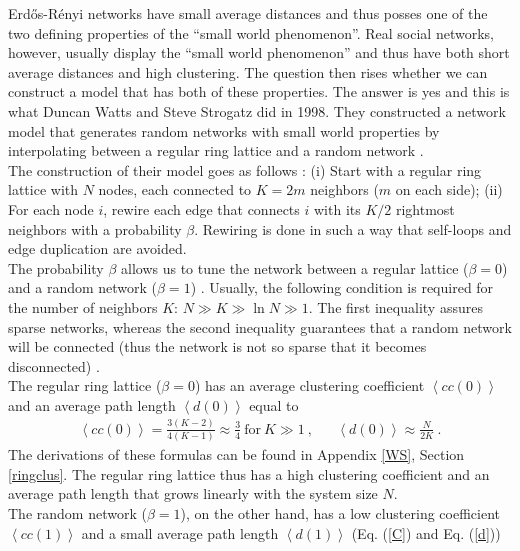 \documentclass[11 pt , letterpaper , twoside , openright]{book}
\begin{document}
Erd\H{o}s-R\'{e}nyi networks have small average distances and thus posses one of the two defining properties of the ``small world phenomenon''. Real social networks, however, usually display the ``small world phenomenon'' and thus have both short average distances and high clustering. The question then rises whether we can construct a model that has both of these properties. The answer is yes and this is what Duncan Watts and Steve Strogatz did in 1998. They constructed a network model that generates random networks with small world properties by interpolating between a regular ring lattice and a random network \cite{Watts1998}.\\
\newline
The construction of their model goes as follows \cite{Watts1998}: (i) Start with a regular ring lattice with $N$ nodes, each connected to $K = 2m$ neighbors ($m$ on each side); (ii) For each node $i$, rewire each edge that connects $i$ with its $K/2$ rightmost neighbors with a probability $\beta$. Rewiring is done in such a way that self-loops and edge duplication are avoided.\\
\newline
The probability $\beta$ allows us to tune the network between a regular lattice ($\beta = 0$) and a random network ($\beta = 1$) \cite{Watts1998}. Usually, the following condition is required for the number of neighbors $K$: $N \gg K \gg \ln{N} \gg 1$. The first inequality assures sparse networks, whereas the second inequality guarantees that a random network will be connected (thus the network is not so sparse that it becomes disconnected) \cite{Watts1998}.\\
\newline
The regular ring lattice ($\beta=0$) has an average clustering coefficient $\left<cc(0)\right>$ and an average path length $\left<d(0)\right>$ equal to \cite{Watts1998}
\begin{align}\label{C0}
	\left<cc(0)\right> = \frac{3(K-2)}{4(K-1)} \approx \frac{3}{4} \ \text{for}\ K \gg 1 \ , && \left<d(0)\right> \approx \frac{N}{2K} \ .
\end{align}
The derivations of these formulas can be found in Appendix \ref{WS}, Section \ref{ringclus}. The regular ring lattice thus has a high clustering coefficient and an average path length that grows linearly with the system size $N$. \\
\newline
The random network ($\beta = 1$), on the other hand, has a low clustering coefficient $\left<cc(1)\right>$ and a small average path length $\left<d(1)\right>$ (Eq. (\ref{C}) and Eq. (\ref{d})) \cite{Watts1998}
\end{document}
